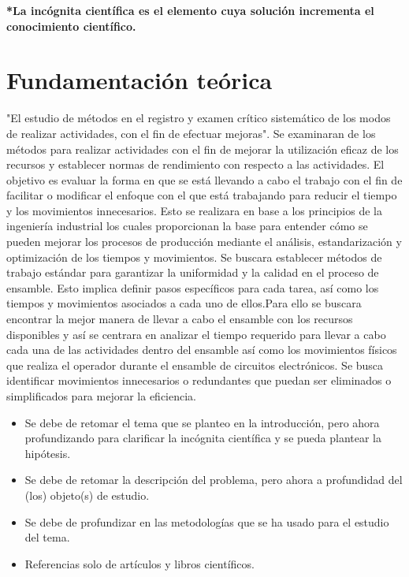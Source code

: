     \textbf{*La incógnita científica es el elemento cuya solución incrementa el conocimiento científico.}
    \section{Fundamentación teórica}
    
    "El estudio de métodos en el registro y examen crítico sistemático de los modos de realizar actividades, con el fin de efectuar mejoras".
    Se examinaran de los métodos para realizar actividades con el fin de mejorar la utilización eficaz de los recursos y establecer normas de rendimiento con respecto a las actividades. El objetivo es evaluar la forma en que se está llevando a cabo el trabajo con el fin de facilitar o modificar el enfoque con el que está trabajando para reducir el tiempo y los movimientos innecesarios. Esto se realizara en base a los principios de la ingeniería industrial los cuales proporcionan la base para entender cómo se pueden mejorar los procesos de producción mediante el análisis, estandarización y optimización de los tiempos y movimientos.
    Se buscara establecer métodos de trabajo estándar para garantizar la uniformidad y la calidad en el proceso de ensamble. Esto implica definir pasos específicos para cada tarea, así como los tiempos y movimientos asociados a cada uno de ellos.Para ello se buscara encontrar la mejor manera de llevar a cabo el ensamble con los recursos disponibles y  así se  centrara en analizar el tiempo requerido para llevar a cabo cada una de las actividades dentro del ensamble así como los movimientos físicos que realiza el operador durante el ensamble de circuitos electrónicos. Se busca identificar movimientos innecesarios o redundantes que puedan ser eliminados o simplificados para mejorar la eficiencia.
    
    
    \begin{itemize}
        \item Se debe de retomar el tema que se planteo en la introducción, pero ahora profundizando para clarificar la incógnita científica y se pueda plantear la hipótesis.
        \item Se debe de retomar la descripción del problema, pero ahora a profundidad del (los) objeto(s) de estudio. 
        \item Se debe de profundizar en las metodologías que se ha usado para el estudio del tema.
        \item Referencias solo de artículos y libros científicos.
    \end{itemize}
